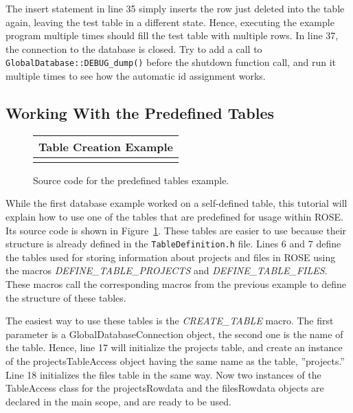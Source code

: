 The insert statement in line 35 simply inserts the row just deleted into the 
table again, leaving the test table in a different state. Hence, executing
the example program multiple times should fill the test table with multiple rows.
In line 37, the connection to the database is closed. Try to add a call to
{\tt GlobalDatabase::DEBUG\_dump()} before the shutdown function call, and run
it multiple times to see how the automatic id assignment works.


\subsection{Working With the Predefined Tables}
\label{sec:TutDB:RoseTables}

\begin{latexonly}
\begin{figure}[tb] 
\begin{center} 
\begin{tabular}{|c|} \hline
     Table Creation Example
\\\hline\hline

\\\hline
\end{tabular} \end{center}
\caption{ \label{fig:TutDB:RoseTables} Source code for the predefined tables example. }
\end{figure} 
\end{latexonly}

While the first database example worked on a self-defined table, this tutorial will 
explain how to use one of the tables that are predefined for usage within ROSE.
Its source code is shown in Figure~\ref{fig:TutDB:RoseTables}. These
tables are easier to use because their structure is already defined in the {\tt TableDefinition.h}
file. Lines 6 and 7 define the tables used for storing information about projects and files
in ROSE using the macros \emph{DEFINE\_TABLE\_PROJECTS} and \emph{DEFINE\_TABLE\_FILES}. 
These macros call the corresponding macros from the previous example to define the structure
of these tables. 

The easiest way to use these tables is the \emph{CREATE\_TABLE} macro.
The first parameter is a GlobalDatabaseConnection object, the second one is the name of the
table. Hence, line 17 will initialize the projects table, and create an instance of
the projectsTableAccess object having the same name as the table, ''projects.'' Line 18
initializes the files table in the same way. Now two instances of the TableAccess class
for the projectsRowdata and the filesRowdata objects are declared in the main scope, and 
are ready to be used. 

